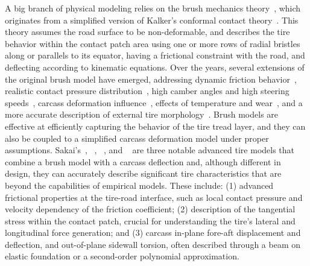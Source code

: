 A big branch of physical modeling relies on the brush mechanics theory~\cite{pacejka2012tire}, which originates from a simplified version of Kalker's conformal contact theory~\cite{kalker1967rolling, kalker1971transient, kalker1979survey, kalker1986railway, kalker1997simulation, meymand2016survey}. This theory assumes the road surface to be non-deformable, and describes the tire behavior within the contact patch area using one or more rows of radial bristles along or parallels to its equator, having a frictional constraint with the road, and deflecting according to kinematic equations. Over the years, several extensions of the original brush model have emerged, addressing dynamic friction behavior~\cite{deur2004brush, deur2005extensions, velenis2005dynamic, kikuuwe2019brushtype}, realistic contact pressure distribution~\cite{miyashita2010tire, fevrier2013method, xu2014analytical}, high camber angles and high steering speeds~\cite{higuchi1999transient, romano2022analytical}, carcass deformation influence~\cite{svendenius2006semiempirical, xu2014analytical, miyashita2010tire, miyashita2003analytical, miyashita2006new, kabe2006new, miyashita2015study, romano2019novel, romano2020unsteadystate, gil2020inplane}, effects of temperature and wear~\cite{fevrier2013method, harsh2019tire}, and a more accurate description of external tire morphology~\cite{chollet2012model, riehm2019brush}. Brush models are effective at efficiently capturing the behavior of the tire tread layer, and they can also be coupled to a simplified carcass deformation model under proper assumptions. Sakai's~\cite{sakai1981theoreticalI, sakai1981theoreticalII, sakai1981theoreticalIII, sakai1982theoreticalIV}, \NeoFiala{}~\cite{miyashita2003analytical, miyashita2006new, kabe2006new, miyashita2015study, miyashita2010tire}, \TreadSim{}~\cite{dehoogh2005implementing}, and \TaMeTire{}~\cite{fevrier2013method} are three notable advanced tire models that combine a brush model with a carcass deflection and, although different in design, they can accurately describe significant tire characteristics that are beyond the capabilities of empirical models. These include: (1) advanced frictional properties at the tire-road interface, such as local contact pressure and velocity dependency of the friction coefficient; (2) description of the tangential stress within the contact patch, crucial for understanding the tire's lateral and longitudinal force generation; and (3) carcass in-plane fore-aft displacement and deflection, and out-of-plane sidewall torsion, often described through a beam on elastic foundation or a second-order polynomial approximation.

